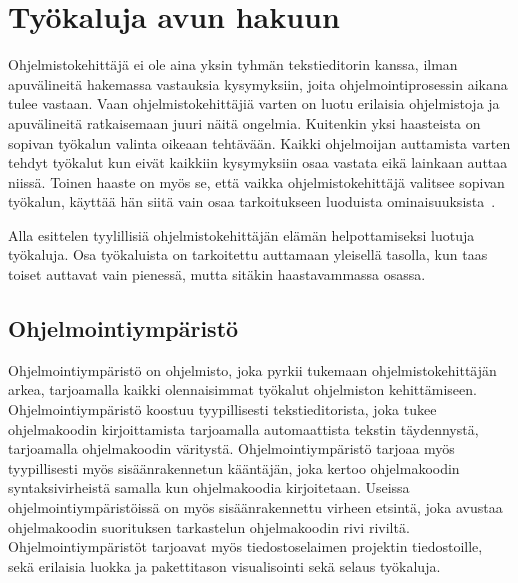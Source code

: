\documentclass[finnish]{../tktltiki2}
\theoremstyle{definition}
\theoremstyle{remark}
\begin{document}
\section{Työkaluja avun hakuun}
Ohjelmistokehittäjä ei ole aina yksin tyhmän tekstieditorin kanssa, ilman apuvälineitä hakemassa vastauksia kysymyksiin, joita ohjelmointiprosessin aikana tulee vastaan. Vaan ohjelmistokehittäjiä varten on luotu erilaisia ohjelmistoja ja apuvälineitä ratkaisemaan juuri näitä ongelmia.
Kuitenkin yksi haasteista on sopivan työkalun valinta oikeaan tehtävään. Kaikki ohjelmoijan auttamista varten tehdyt työkalut kun eivät kaikkiin kysymyksiin osaa vastata eikä lainkaan auttaa niissä. Toinen haaste on myös se, että vaikka ohjelmistokehittäjä valitsee sopivan työkalun, käyttää hän siitä vain osaa tarkoitukseen luoduista ominaisuuksista~\cite{whyline}.

Alla esittelen tyylillisiä ohjelmistokehittäjän elämän helpottamiseksi luotuja työkaluja. Osa työkaluista on tarkoitettu auttamaan yleisellä tasolla, kun taas toiset auttavat vain pienessä, mutta sitäkin haastavammassa osassa.

\subsection{Ohjelmointiympäristö}
Ohjelmointiympäristö on ohjelmisto, joka pyrkii tukemaan ohjelmistokehittäjän arkea, tarjoamalla kaikki olennaisimmat työkalut ohjelmiston kehittämiseen. Ohjelmointiympäristö koostuu tyypillisesti tekstieditorista, joka tukee ohjelmakoodin kirjoittamista tarjoamalla automaattista tekstin täydennystä, tarjoamalla ohjelmakoodin väritystä. Ohjelmointiympäristö tarjoaa myös tyypillisesti myös sisäänrakennetun kääntäjän, joka kertoo ohjelmakoodin syntaksivirheistä samalla kun ohjelmakoodia kirjoitetaan. Useissa ohjelmointiympäristöissä on myös sisäänrakennettu virheen etsintä, joka avustaa ohjelmakoodin suorituksen tarkastelun ohjelmakoodin rivi riviltä. Ohjelmointiympäristöt tarjoavat myös tiedostoselaimen projektin tiedostoille, sekä erilaisia luokka ja pakettitason visualisointi sekä selaus työkaluja.
\end{document}
